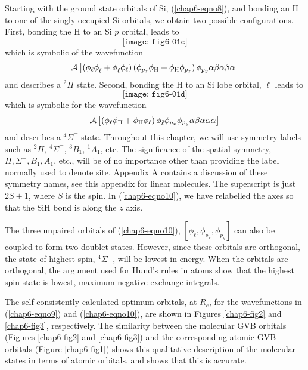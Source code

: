 Starting with the ground state orbitals of Si, (\ref{chap6-eqno8}),
and bonding an H to one of the singly-occupied Si orbitals, we obtain
two possible configurations.  First, bonding the H to an Si $p$
orbital, leads to
\begin{equation}
\texttt{[image: fig6-01c]}
\label{chap6-eqno9}
\end{equation}
which is symbolic of the wavefunction
\begin{equation}
{\cal A} \left[ \left( \phi_{\ell} \phi_{\bar{\ell}} + \phi_{\bar{\ell}} 
\phi_{\ell} 
\right) \left( \phi_{p_z} \phi_\mathrm{H} + \phi_\mathrm{H} \phi_{p_z} \right) 
\phi_{p_y} \alpha \beta \alpha \beta \alpha \right]
\end{equation}
and describes a ${^2\Pi}$ state.  Second, bonding the H to an Si 
lobe orbital, $\ell$ leads to
\begin{equation}
\texttt{[image: fig6-01d]}
\label{chap6-eqno10}
\end{equation}
which is symbolic for the wavefunction
\begin{equation}
{\cal A} \left[ \left( \phi_{\ell} \phi_\mathrm{H} + \phi_\mathrm{H}
  \phi_{\ell} \right)  \phi_{\bar{\ell}} \phi_{p_x} \phi_{p_y} \alpha
  \beta \alpha \alpha  \alpha \right]
\end{equation}
and describes a ${^4\Sigma}^-$ state.  Throughout this chapter, we
will use symmetry labels such as ${^2\Pi}$, ${^4\Sigma}^-$, ${^3B}_1$,
${^1A}_1$, etc.  The significance of the spatial symmetry, $\Pi,
\Sigma^-, B_1, A_1$, etc., will be of no importance other than
providing the label normally used to denote site.  Appendix A contains
a discussion of these symmetry names, see this appendix for linear
molecules.  The superscript is just $2S+1$, where $S$ is the spin.  In
(\ref{chap6-eqno10}), we have relabelled the axes so that the SiH bond
is along the $z$ axis.

The three unpaired orbitals of (\ref{chap6-eqno10}),
$[\phi_{\bar{\ell}} , \phi_{p_x} , \phi_{p_y} ]$ can also be coupled
to form two doublet states.  However, since these orbitals are
orthogonal, the state of highest spin, ${^4\Sigma}^-$, will be lowest
in energy.  When the orbitals are orthogonal, the argument used for
Hund's rules in atoms show that the highest spin state is lowest,
maximum negative exchange integrals.

The self-consistently calculated optimum orbitals, at $R_e$, for the
wavefunctions in (\ref{chap6-eqno9}) and (\ref{chap6-eqno10}), are
shown in Figures \ref{chap6-fig2} and \ref{chap6-fig3}, respectively.
The similarity between the molecular GVB orbitals (Figures
\ref{chap6-fig2} and \ref{chap6-fig3}) and the corresponding atomic
GVB orbitals (Figure \ref{chap6-fig1}) shows this qualitative
description of the molecular states in terms of atomic orbitals, and
shows that this is accurate.

